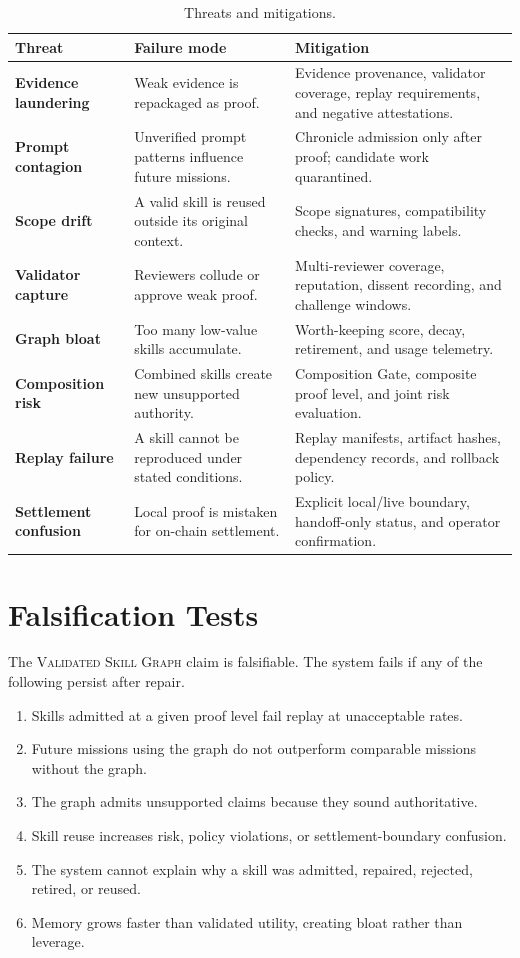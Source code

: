 \documentclass[10.5pt]{article}
\theoremstyle{goThm}
\newcommand{\vsg}{\textsc{Validated Skill Graph}}
\begin{document}
\begin{table}[H]
\centering
\caption{Threats and mitigations.}
\label{tab:threats}
\begin{tabularx}{\textwidth}{>{\bfseries\color{goNavy}}p{}p{}X}
\toprule
Threat & Failure mode & Mitigation \\
\midrule
Evidence laundering & Weak evidence is repackaged as proof. & Evidence provenance, validator coverage, replay requirements, and negative attestations. \\
Prompt contagion & Unverified prompt patterns influence future missions. & Chronicle admission only after proof; candidate work quarantined. \\
Scope drift & A valid skill is reused outside its original context. & Scope signatures, compatibility checks, and warning labels. \\
Validator capture & Reviewers collude or approve weak proof. & Multi-reviewer coverage, reputation, dissent recording, and challenge windows. \\
Graph bloat & Too many low-value skills accumulate. & Worth-keeping score, decay, retirement, and usage telemetry. \\
Composition risk & Combined skills create new unsupported authority. & Composition Gate, composite proof level, and joint risk evaluation. \\
Replay failure & A skill cannot be reproduced under stated conditions. & Replay manifests, artifact hashes, dependency records, and rollback policy. \\
Settlement confusion & Local proof is mistaken for on-chain settlement. & Explicit local/live boundary, handoff-only status, and operator confirmation. \\
\bottomrule
\end{tabularx}
\end{table}

\section{Falsification Tests}
The \vsg{} claim is falsifiable. The system fails if any of the following persist after repair.

\begin{enumerate}[label=\textbf{T\arabic*.}]
  \item Skills admitted at a given proof level fail replay at unacceptable rates.
  \item Future missions using the graph do not outperform comparable missions without the graph.
  \item The graph admits unsupported claims because they sound authoritative.
  \item Skill reuse increases risk, policy violations, or settlement-boundary confusion.
  \item The system cannot explain why a skill was admitted, repaired, rejected, retired, or reused.
  \item Memory grows faster than validated utility, creating bloat rather than leverage.
\end{enumerate}
\end{document}
